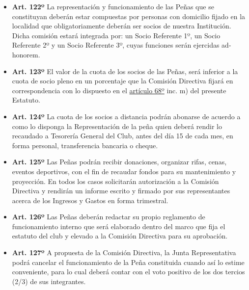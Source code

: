 \documentclass[]{book}
\providecommand{\tightlist}{%
  \setlength{\itemsep}{0pt}\setlength{\parskip}{0pt}}
\begin{document}
\begin{itemize}
\tightlist
\item
  \textbf{Art. 122º}
  La representación y funcionamiento de las Peñas que se constituyan deberán estar compuestas por personas con domicilio fijado en la localidad que obligatoriamente deberán ser socios de nuestra Institución. Dicha comisión estará integrada por: un Socio Referente 1º, un Socio Referente 2º y un Socio Referente 3º, cuyas funciones serán ejercidas ad-honorem.
\end{itemize}

\begin{itemize}
\tightlist
\item
  \textbf{Art. 123º}
  El valor de la cuota de los socios de las Peñas, será inferior a la cuota de socio pleno en un porcentaje que la Comisión Directiva fijará en correspondencia con lo dispuesto en el \protect\hyperlink{art68}{artículo 68º} inc. m) del presente Estatuto.
\end{itemize}

\begin{itemize}
\tightlist
\item
  \textbf{Art. 124º}
  La cuota de los socios a distancia podrán abonarse de acuerdo a como lo disponga la Representación de la peña quien deberá rendir lo recaudado a Tesorería General del Club, antes del día 15 de cada mes, en forma personal, transferencia bancaria o cheque.
\end{itemize}

\begin{itemize}
\tightlist
\item
  \textbf{Art. 125º}
  Las Peñas podrán recibir donaciones, organizar rifas, cenas, eventos deportivos, con el fin de recaudar fondos para su mantenimiento y proyección. En todos los casos solicitarán autorización a la Comisión Directiva y rendirán un informe escrito y firmado por sus representantes acerca de los Ingresos y Gastos en forma trimestral.
\end{itemize}

\begin{itemize}
\tightlist
\item
  \textbf{Art. 126º}
  Las Peñas deberán redactar su propio reglamento de funcionamiento interno que será elaborado dentro del marco que fija el estatuto del club y elevado a la Comisión Directiva para su aprobación.
\end{itemize}

\begin{itemize}
\tightlist
\item
  \textbf{Art. 127º}
  A propuesta de la Comisión Directiva, la Junta Representativa podrá cancelar el funcionamiento de la Peña constituida cuando así lo estime conveniente, para lo cual deberá contar con el voto positivo de los dos tercios (2/3) de sus integrantes.
\end{itemize}
\end{document}
